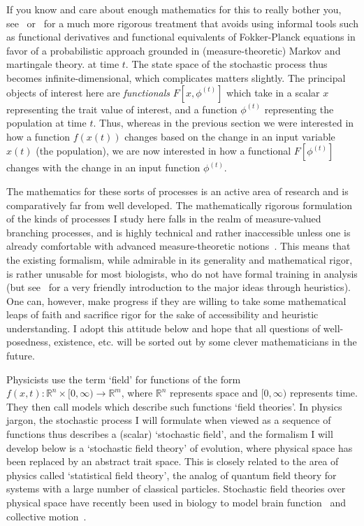 {If you know and care about enough mathematics for this to really bother you, see~\citet{champagnat_unifying_2006} or~\citet{champagnat_individual_2008} for a much more rigorous treatment that avoids using informal tools such as functional derivatives and functional equivalents of Fokker-Planck equations in favor of a probabilistic approach grounded in (measure-theoretic) Markov and martingale theory.} at time $t$. The state space of the stochastic process thus becomes infinite-dimensional, which complicates matters slightly. The principal objects of interest here are \emph{functionals} $F[x, \phi^{(t)}]$ which take in a scalar $x$ representing the trait value of interest, and a function $\phi^{(t)}$ representing the population at time $t$. Thus, whereas in the previous section we were interested in how a function $f(x(t))$ changes based on the change in an input variable $x(t)$ (the population), we are now interested in how a functional $F[\phi^{(t)}]$ changes with the change in an input function $\phi^{(t)}$.

The mathematics for these sorts of processes is an active area of research and is comparatively far from well developed. The mathematically rigorous formulation of the kinds of processes I study here falls in the realm of measure-valued branching processes, and is highly technical and rather inaccessible unless one is already comfortable with advanced measure-theoretic notions~\citep{champagnat_unifying_2006,champagnat_individual_2008}. This means that the existing formalism, while admirable in its generality and mathematical rigor, is rather unusable for most biologists, who do not have formal training in analysis (but see~\citet{week_white_2021} for a very friendly introduction to the major ideas through heuristics). One can, however, make progress if they are willing to take some mathematical leaps of faith and sacrifice rigor for the sake of accessibility and heuristic understanding. I adopt this attitude below and hope that all questions of well-posedness, existence, etc. will be sorted out by some clever mathematicians in the future.

Physicists use the term `field' for functions of the form $f(x,t):\mathbb{R}^{n} \times [0,\infty) \to \mathbb{R}^{m}$, where $\mathbb{R}^{n}$ represents space and $[0,\infty)$ represents time. They then call models which describe such functions `field theories'. In physics jargon, the stochastic process I will formulate when viewed as a sequence of functions thus describes a (scalar) `stochastic field', and the formalism I will develop below is a `stochastic field theory' of evolution, where physical space has been replaced by an abstract trait space. This is closely related to the area of physics called `statistical field theory', the analog of quantum field theory for systems with a large number of classical particles. Stochastic field theories over physical space have recently been used in biology to model brain function~\citep{bressloff_stochastic_2010} and collective motion~\citep{o_laighleis_minimal_2018}.

